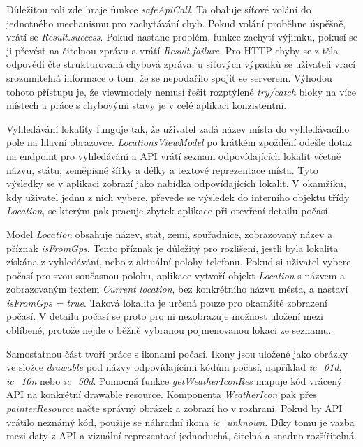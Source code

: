 \documentclass[12pt,a4paper]{article}
\begin{document}
Důležitou roli zde hraje funkce \textit{safeApiCall}. Ta obaluje síťové volání do jednotného mechanismu pro zachytávání chyb. Pokud volání proběhne úspěšně, vrátí se \textit{Result.success}. Pokud nastane problém, funkce zachytí výjimku, pokusí se ji převést na čitelnou zprávu a vrátí \textit{Result.failure}. Pro HTTP chyby se z těla odpovědi čte strukturovaná chybová zpráva, u síťových výpadků se uživateli vrací srozumitelná informace o tom, že se nepodařilo spojit se serverem. Výhodou tohoto přístupu je, že viewmodely nemusí řešit rozptýlené \textit{try/catch} bloky na více místech a práce s chybovými stavy je v celé aplikaci konzistentní.

Vyhledávání lokality funguje tak, že uživatel zadá název místa do vyhledávacího pole na hlavní obrazovce. \textit{LocationsViewModel} po krátkém zpoždění odešle dotaz na endpoint pro vyhledávání a API vrátí seznam odpovídajících lokalit včetně názvu, státu, zeměpisné šířky a délky a textové reprezentace místa. Tyto výsledky se v aplikaci zobrazí jako nabídka odpovídajících lokalit. V okamžiku, kdy uživatel jednu z nich vybere, převede se výsledek do interního objektu třídy \textit{Location}, se kterým pak pracuje zbytek aplikace při otevření detailu počasí.

Model \textit{Location} obsahuje název, stát, zemi, souřadnice, zobrazovaný název a příznak \textit{isFromGps}. Tento příznak je důležitý pro rozlišení, jestli byla lokalita získána z vyhledávání, nebo z aktuální polohy telefonu. Pokud si uživatel vybere počasí pro svou současnou polohu, aplikace vytvoří objekt \textit{Location} s názvem a zobrazovaným textem \textit{Current location}, bez konkrétního názvu města, a nastaví \textit{isFromGps = true}. Taková lokalita je určená pouze pro okamžité zobrazení počasí. V detailu počasí se proto pro ni nezobrazuje možnost uložení mezi oblíbené, protože nejde o běžně vybranou pojmenovanou lokaci ze seznamu.

Samostatnou část tvoří práce s ikonami počasí. Ikony jsou uložené jako obrázky ve složce \textit{drawable} pod názvy odpovídajícími kódům počasí, například \textit{ic\_01d}, \textit{ic\_10n} nebo \textit{ic\_50d}. Pomocná funkce \textit{getWeatherIconRes} mapuje kód vrácený API na konkrétní drawable resource. Komponenta \textit{WeatherIcon} pak přes \textit{painterResource} načte správný obrázek a zobrazí ho v rozhraní. Pokud by API vrátilo neznámý kód, použije se náhradní ikona \textit{ic\_unknown}. Díky tomu je vazba mezi daty z API a vizuální reprezentací jednoduchá, čitelná a snadno rozšířitelná.
\end{document}
